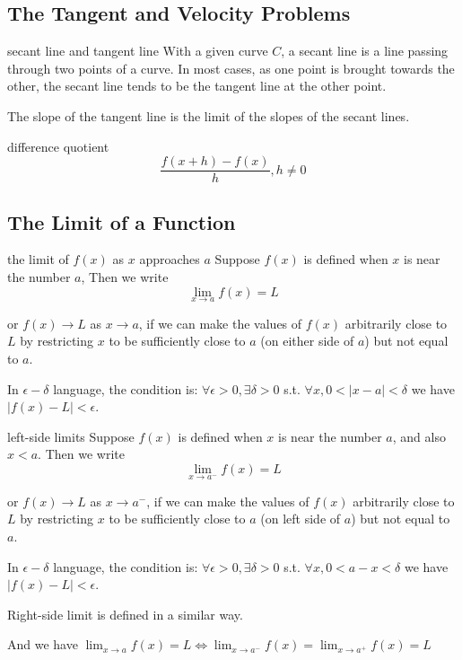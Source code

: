 \documentclass[Calculus 1 Recitation.tex]{subfiles}
\begin{document}
\subsection{The Tangent and Velocity Problems}

\begin{myleftlinebox}
	secant line and tangent line
	\tcblower
	With a given curve $C$, a secant line is a line passing through two points of a curve. In most cases, as one point is brought towards the other, the secant line tends to be the tangent line at the other point.

	The slope of the tangent line is the limit of the slopes of the secant
	lines.
\end{myleftlinebox}

\begin{myleftlinebox}
	difference quotient
	\tcblower
	\[\frac{f(x+h)-f(x)}{h}, h\neq0\]
\end{myleftlinebox}


\subsection{The Limit of a Function}\label{sec:funcLimit}

\begin{myleftlinebox}
	the limit of $f(x)$ as $x$ approaches $a$
	\tcblower
	Suppose $f(x)$ is defined when $x$ is near the number $a$, Then we write
	\[\lim_{x\to a}f(x)=L\]

	or \(f(x)\to L\) as $x\to a$, if we can make the values of $f(x)$ arbitrarily close to $L$ 	by restricting $x$ to be sufficiently close to $a$ (on either side of $a$) but not equal to $a$. 

	In $\epsilon-\delta$ language, the condition is: $\forall \epsilon > 0, \exists \delta > 0$ s.t. $\forall x, 0 < |x - a| < \delta$ we have $|f(x) - L| < \epsilon$.
\end{myleftlinebox}

\begin{myleftlinebox}
	left-side limits
	\tcblower
	Suppose $f(x)$ is defined when $x$ is near the number $a$, and also $x<a$. Then we write
	\[\lim_{x\to a^-}f(x)=L\]

	or \(f(x)\to L\) as $x\to a^-$, if we can make the values of $f(x)$ arbitrarily close to $L$ by restricting $x$ to be sufficiently close to $a$ (on left side of $a$) but not equal to $a$. 

	In $\epsilon-\delta$ language, the condition is: $\forall \epsilon > 0, \exists \delta > 0$ s.t. $\forall x, 0 < a-x < \delta$ we have $|f(x) - L| < \epsilon$.

	Right-side limit is defined in a similar way. 

	And we have $\lim_{x\to a}f(x)=L \iff \lim_{x\to a^-}f(x)=\lim_{x\to a^+}f(x)=L$
\end{myleftlinebox}
\end{document}
